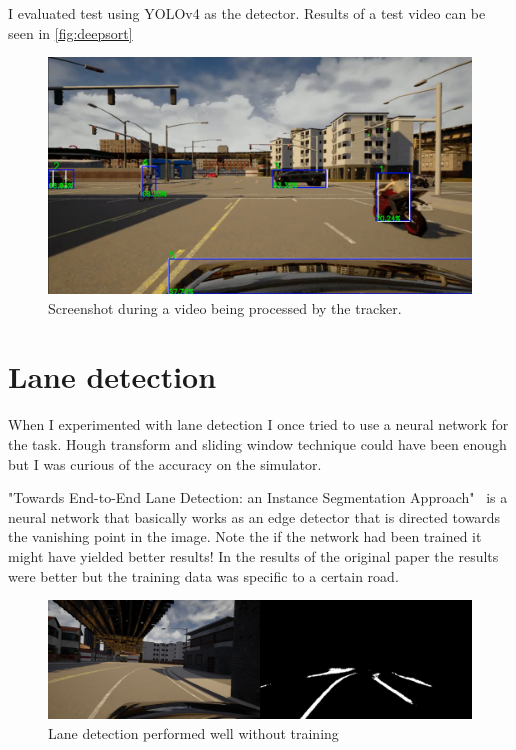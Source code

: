 I evaluated test using YOLOv4 as the detector. Results of a test video can be seen in
\autoref{fig:deepsort}

\begin{figure}[!ht]
	\centering
	\includegraphics[width=150mm, keepaspectratio]{figures/deepsort.png}
	\caption{Screenshot during a video being processed by the tracker.}
	\label{fig:deepsort}
\end{figure}

\section{Lane detection}

When I experimented with lane detection I once tried to use a neural network for
the task. Hough transform and sliding window technique could have been enough
but I was curious of the accuracy on the simulator. 

"Towards End-to-End Lane Detection: an Instance Segmentation
Approach"~\cite{DBLP:journals/corr/abs-1903-11027} is a neural network that
basically works as an edge detector that is directed towards the vanishing point
in the image. Note the if the network had been trained it might have yielded
better results! In the results of the original paper the results were better but
the training data was specific to a certain road.

\begin{figure}[!ht]
	\centering
	\includegraphics[width=150mm, keepaspectratio]{figures/lanedet.png}
	\caption{Lane detection performed well without training}
	\label{fig:lanedet}
\end{figure}

